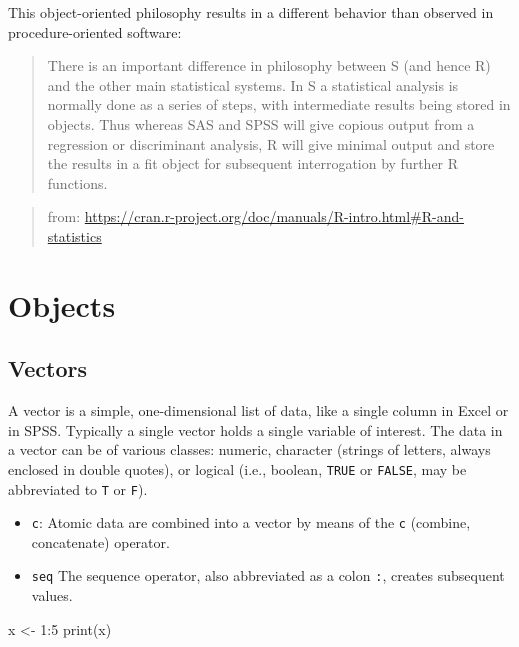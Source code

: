 \documentclass[
]{book}
\newenvironment{Shaded}{\begin{snugshade}}{\end{snugshade}}
\newcommand{\DecValTok}[1]{\textcolor[rgb]{0.00,0.00,0.81}{#1}}
\newcommand{\FunctionTok}[1]{\textcolor[rgb]{0.00,0.00,0.00}{#1}}
\newcommand{\NormalTok}[1]{#1}
\newcommand{\OtherTok}[1]{\textcolor[rgb]{0.56,0.35,0.01}{#1}}
\newcommand{\SpecialCharTok}[1]{\textcolor[rgb]{0.00,0.00,0.00}{#1}}
\begin{document}
This object-oriented philosophy results in a different behavior than
observed in procedure-oriented software:

\begin{quote}
There is an important difference in philosophy between S (and hence R)
and the other main statistical systems. In S a statistical analysis is
normally done as a series of steps, with intermediate results being
stored in objects. Thus whereas SAS and SPSS will give copious output
from a regression or discriminant analysis, R will give minimal output
and store the results in a fit object for subsequent interrogation by
further R functions.
\end{quote}

\begin{quote}
from: \url{https://cran.r-project.org/doc/manuals/R-intro.html\#R-and-statistics}
\end{quote}

\hypertarget{ch-objects}{%
\chapter{Objects}\label{ch-objects}}

\hypertarget{sec:vectors}{%
\section{Vectors}\label{sec:vectors}}

A vector is a simple, one-dimensional list of data, like a single column
in Excel or in SPSS. Typically a single vector holds a single variable
of interest. The data in a vector can be of various classes: numeric,
character (strings of letters, always enclosed in double quotes), or
logical (i.e., boolean, \texttt{TRUE} or
\texttt{FALSE}, may be abbreviated to
\texttt{T} or \texttt{F}).

\begin{itemize}
\item
  \texttt{c}: Atomic data are combined into a vector by means of the
  \texttt{c} (combine, concatenate) operator.
\item
  \texttt{seq} The sequence operator, also abbreviated as a colon
  \texttt{:}, creates subsequent values.
\end{itemize}

\begin{Shaded}
\begin{Highlighting}[]
\NormalTok{x }\OtherTok{\textless{}{-}} \DecValTok{1}\SpecialCharTok{:}\DecValTok{5}
\FunctionTok{print}\NormalTok{(x)}
\end{Highlighting}
\end{Shaded}
\end{document}
